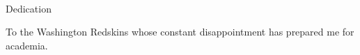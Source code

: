 
\renewcommand{\baselinestretch}{2}
\small\normalsize
\hbox{\ }

\vspace{-.65in}

\begin{center}
\large{Dedication}
\end{center}

To the Washington Redskins whose constant disappointment has prepared me for academia.

